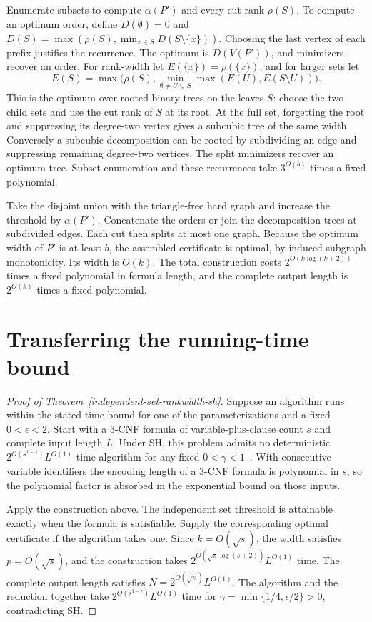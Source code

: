 \documentclass[11pt]{article}
\begin{document}
Enumerate subsets to compute \(\alpha(P')\) and every cut rank
\(\rho(S)\). To compute an optimum order, define \(D(\emptyset)=0\)
and \(D(S)=\max(\rho(S),\min_{x\in S}D(S\setminus\{x\}))\).
Choosing the last vertex of each prefix justifies the recurrence.
The optimum is \(D(V(P'))\), and minimizers recover an order.
For rank-width let \(E(\{x\})=\rho(\{x\})\), and for larger sets let
\[
 E(S)=\max\bigl(\rho(S),
       \min_{\emptyset\ne U\subsetneq S}\max(E(U),E(S\setminus U))\bigr).
\]
This is the optimum over rooted binary trees on the leaves \(S\):
choose the two child sets and use the cut rank of \(S\) at its root.
At the full set, forgetting the root and suppressing its
degree-two vertex gives a subcubic tree of the same width.
Conversely a subcubic decomposition can be rooted by subdividing
an edge and suppressing remaining degree-two vertices. The
split minimizers recover an optimum tree. Subset enumeration
and these recurrences take \(3^{O(b)}\) times a fixed polynomial.

Take the disjoint union with the triangle-free hard graph and
increase the threshold by \(\alpha(P')\). Concatenate the orders
or join the decomposition trees at subdivided edges. Each cut
then splits at most one graph. Because the optimum width of \(P'\)
is at least \(b\), the assembled certificate is optimal, by
induced-subgraph monotonicity. Its width is \(O(k)\). The total
construction costs \(2^{O(k\log(k+2))}\) times a fixed polynomial
in formula length, and the complete output length is
\(2^{O(k)}\) times a fixed polynomial.

\section{Transferring the running-time bound}

\begin{proof}[Proof of Theorem~\ref{independent-set-rankwidth-sh}]
Suppose an algorithm runs within the stated time bound for one of
the parameterizations and a fixed \(0<\epsilon<2\). Start with a 3-CNF
formula of variable-plus-clause count \(s\) and complete input length
\(L\). Under SH, this problem admits no deterministic
\(2^{O(s^{1-\gamma})}L^{O(1)}\)-time algorithm for any fixed
\(0<\gamma<1\)~\cite[Lemma 2.1]{sh}. With consecutive variable
identifiers the encoding length of a 3-CNF formula is polynomial
in \(s\), so the polynomial factor is absorbed in the exponential
bound on those inputs.

Apply the construction above. The independent set threshold is
attainable exactly when the formula is satisfiable. Supply the
corresponding optimal certificate if the algorithm takes one.
Since \(k=O(\sqrt{s})\), the width satisfies \(p=O(\sqrt{s})\), and the
construction takes \(2^{O(\sqrt{s}\log(s+2))}L^{O(1)}\) time.
The complete output length satisfies \(N=2^{O(\sqrt{s})}L^{O(1)}\).
The algorithm and the reduction together take
\(2^{O(s^{1-\gamma})}L^{O(1)}\) time for
\(\gamma=\min\{1/4,\epsilon/2\}>0\), contradicting SH.
\end{proof}
\end{document}
